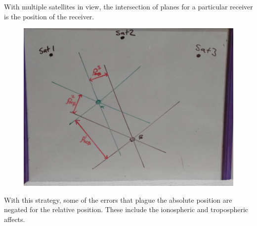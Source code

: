 \documentclass[11pt,a4paper]{article}
\begin{document}
With multiple satellites in view, the intersection of planes for a particular receiver is the position of the receiver.
\begin{figure}[h]
\centering
\caption{}
\label{fig:overall_multiS_duelR}
\includegraphics[width=0.7\linewidth]{overall_multiS_duelR}
\end{figure}

With this strategy, some of the errors that plague the absolute position are negated for the relative position. These include the ionospheric and tropospheric affects.
















\end{document}
